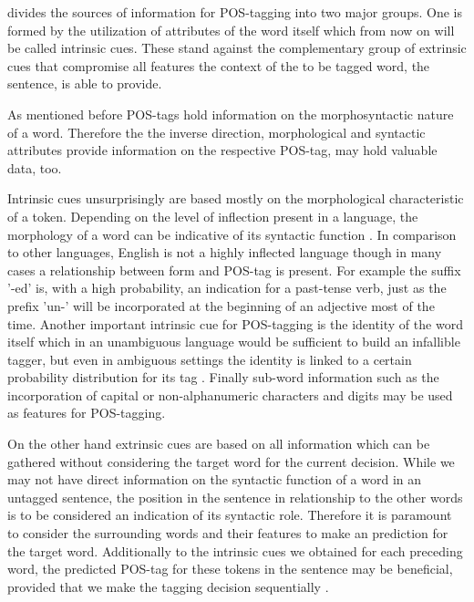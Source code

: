 \cite{goldberg2017neural} divides the sources of information for POS-tagging into two major groups. 
One is formed by the utilization of attributes of the word itself which from now on will be called intrinsic cues. 
These stand against the complementary group of extrinsic cues that compromise all features the context of the to be tagged word, the sentence, is able to provide.

As mentioned before POS-tags hold information on the morphosyntactic nature of a word. 
Therefore the the inverse direction, morphological and syntactic attributes provide information on the respective POS-tag, may hold valuable data, too.

Intrinsic cues unsurprisingly are based mostly on the morphological characteristic of a token. 
Depending on the level of inflection present in a language, the morphology of a word can be indicative of its syntactic function \citep{earl1966part}. 
In comparison to other languages, English is not a highly inflected language though in many cases a relationship between form and POS-tag is present.
For example the suffix '-ed' is, with a high probability, an indication for a past-tense verb, just as the prefix 'un-' will be incorporated at the beginning of an adjective most of the time.
Another important intrinsic cue for POS-tagging is the identity of the word itself which in an unambiguous language would be sufficient to build an infallible tagger, but even in ambiguous settings the identity is linked to a certain probability distribution for its tag \citep{goldberg2017neural}. 
Finally sub-word information such as the incorporation of capital or non-alphanumeric characters and digits may be used as features for POS-tagging.

On the other hand extrinsic cues are based on all information which can be gathered without considering the target word for the current decision.
While we may not have direct information on the syntactic function of a word in an untagged sentence, the position in the sentence in relationship to the other words is to be considered an indication of its syntactic role. 
Therefore it is paramount to consider the surrounding words and their features to make an prediction for the target word. 
Additionally to the intrinsic cues we obtained for each preceding word, the predicted POS-tag for these tokens in the sentence may be beneficial, provided that we make the tagging decision sequentially \citep{goldberg2017neural}.

